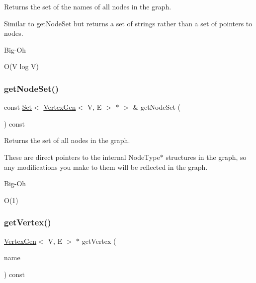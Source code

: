 Returns the set of the names of all nodes in the graph. 

Similar to get\+Node\+Set but returns a set of strings rather than a set of pointers to nodes. \begin{DoxyRefDesc}{Big-\/\+Oh}
\item[\mbox{\hyperlink{BigOh__BigOh000076}{Big-\/\+Oh}}]O(\+V log V) \end{DoxyRefDesc}
\mbox{\label{classGraph_abd5552888f57aaa581099e8146c617c9}} 
\subsubsection{\texorpdfstring{get\+Node\+Set()}{getNodeSet()}}
{\footnotesize\ttfamily const \mbox{\hyperlink{classSet}{Set}}$<$ \mbox{\hyperlink{classVertexGen}{Vertex\+Gen}}$<$ V, E $>$  $\ast$ $>$ \& get\+Node\+Set (\begin{DoxyParamCaption}{ }\end{DoxyParamCaption}) const\hspace{0.3cm}{\ttfamily [inherited]}}



Returns the set of all nodes in the graph. 

These are direct pointers to the internal Node\+Type$\ast$ structures in the graph, so any modifications you make to them will be reflected in the graph. \begin{DoxyRefDesc}{Big-\/\+Oh}
\item[\mbox{\hyperlink{BigOh__BigOh000077}{Big-\/\+Oh}}]O(1) \end{DoxyRefDesc}
\mbox{\label{classBasicGraphGen_a4c0c055103d2adba54014d301ae7bd1c}} 
\subsubsection{\texorpdfstring{get\+Vertex()}{getVertex()}}
{\footnotesize\ttfamily \mbox{\hyperlink{classVertexGen}{Vertex\+Gen}}$<$ V, E $>$ $\ast$ get\+Vertex (\begin{DoxyParamCaption}\item[{const std\+::string \&}]{name }\end{DoxyParamCaption}) const}



